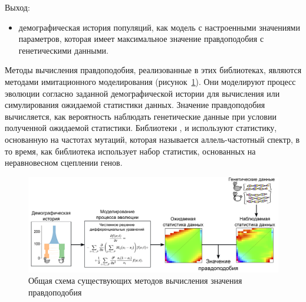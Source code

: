 Выход:
\begin{itemize}
    \item демографическая история популяций, как модель с настроенными значениями параметров, которая имеет максимальное значение правдоподобия с генетическими данными.\\
\end{itemize}

Методы вычисления правдоподобия, реализованные в этих библиотеках, являются методами имитационного моделирования (рисунок~\ref{fig:ll_scheme}).
Они моделируют процесс эволюции согласно заданной демографической истории для вычисления или симулирования ожидаемой статистики данных.
Значение правдоподобия вычисляется, как вероятность наблюдать генетические данные при условии полученной ожидаемой статистики.
Библиотеки \dadi, \moments и \momi используют статистику, основанную на частотах мутаций, которая называется аллель-частотный спектр, в то время, как библиотека \momentsLD использует набор статистик, основанных на неравновесном сцеплении генов.


\begin{figure}[ht]
    \centering
    \includegraphics[width=\textwidth]{images_2/dadi_incide.pdf}
    \caption{Общая схема существующих методов вычисления значения правдоподобия}
    \label{fig:ll_scheme}
\end{figure}



